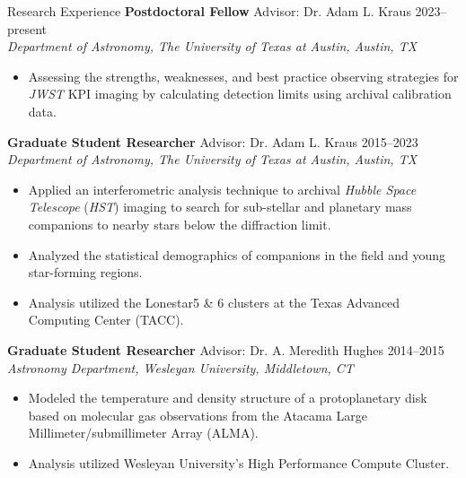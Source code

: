 \documentclass{resume} %
\begin{document}
\begin{rSection}{Research Experience}\itemsep -5pt  
    {\bf Postdoctoral Fellow} Advisor: Dr. Adam L. Kraus \hfill {2023--present}\\{\em Department of Astronomy, The University of Texas at Austin, Austin, TX}
    \vspace{-5pt}
    \begin{changemargin}{0in}{0.4in}
    \begin{itemize}
    \setlength\itemsep{-5pt}
\item Assessing the strengths, weaknesses, and best practice observing strategies for \emph{JWST} KPI imaging by calculating detection limits using archival calibration data.
    \end{itemize}
    \end{changemargin}

    {\bf Graduate Student Researcher} Advisor: Dr. Adam L. Kraus \hfill {2015--2023}\\{\em Department of Astronomy, The University of Texas at Austin, Austin, TX}
    \vspace{-5pt}
    \begin{changemargin}{0in}{0.4in}
    \begin{itemize}
    \setlength\itemsep{-5pt}
\item Applied an interferometric analysis technique to archival \emph{Hubble Space Telescope} (\emph{HST}) imaging to search for sub-stellar and planetary mass companions to nearby stars below the diffraction limit.
\item Analyzed the statistical demographics of companions in the field and young star-forming regions.
\item Analysis utilized the Lonestar5 \& 6 clusters at the Texas Advanced Computing Center (TACC).
    \end{itemize}
    \end{changemargin}

{\bf Graduate Student Researcher} Advisor: Dr. A. Meredith Hughes \hfill {2014--2015}\\{\em Astronomy Department, Wesleyan University, Middletown, CT}
    \vspace{-5pt}
    \begin{changemargin}{0in}{0.4in}
\begin{itemize}
    \setlength\itemsep{-5pt}
    \item Modeled the temperature and density structure of a protoplanetary disk based on molecular gas observations from the Atacama Large Millimeter/submillimeter Array (ALMA).
    \item Analysis utilized Wesleyan University's High Performance Compute Cluster.
\end{itemize} 
    \end{changemargin}


\end{rSection}
\end{document}
